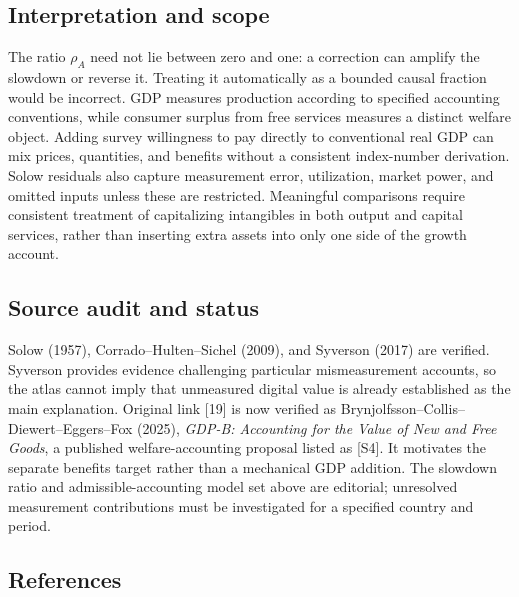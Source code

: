 \documentclass[11pt,a4paper]{article}
\begin{document}
\subsection*{Interpretation and scope}

The ratio $\rho_A$ need not lie between zero and one: a correction can amplify the slowdown or reverse it. Treating it automatically as a bounded causal fraction would be incorrect. GDP measures production according to specified accounting conventions, while consumer surplus from free services measures a distinct welfare object. Adding survey willingness to pay directly to conventional real GDP can mix prices, quantities, and benefits without a consistent index-number derivation. Solow residuals also capture measurement error, utilization, market power, and omitted inputs unless these are restricted. Meaningful comparisons require consistent treatment of capitalizing intangibles in both output and capital services, rather than inserting extra assets into only one side of the growth account.

\subsection*{Source audit and status}

Solow (1957), Corrado--Hulten--Sichel (2009), and Syverson (2017) are verified. Syverson provides evidence challenging particular mismeasurement accounts, so the atlas cannot imply that unmeasured digital value is already established as the main explanation. Original link [19] is now verified as Brynjolfsson--Collis--Diewert--Eggers--Fox (2025), \emph{GDP-B: Accounting for the Value of New and Free Goods}, a published welfare-accounting proposal listed as [S4]. It motivates the separate benefits target rather than a mechanical GDP addition. The slowdown ratio and admissible-accounting model set above are editorial; unresolved measurement contributions must be investigated for a specified country and period.

\subsection*{References}
\end{document}
